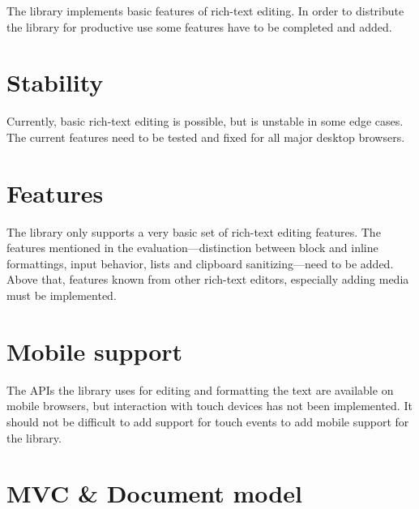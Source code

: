 The library implements basic features of rich-text editing. In order to distribute the library for productive use some features have to be completed and added.

\section{Stability}

Currently, basic rich-text editing is possible, but is unstable in some edge cases. The current features need to be tested and fixed for all major desktop browsers.

\section{Features}

The library only supports a very basic set of rich-text editing features. The features mentioned in the evaluation---distinction between block and inline formattings, input behavior, lists and clipboard sanitizing---need to be added. Above that, features known from other rich-text editors, especially adding media must be implemented.


\section{Mobile support}

The APIs the library uses for editing and formatting the text are available on mobile browsers, but interaction with touch devices has not been implemented. It should not be difficult to add support for touch events to add mobile support for the library.


\section{MVC \& Document model}

